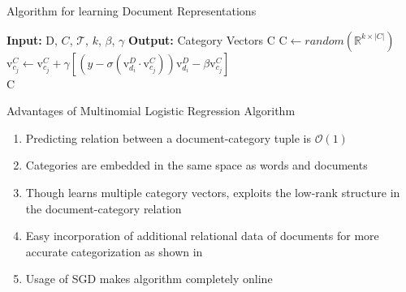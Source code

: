 \documentclass[10pt]{beamer}
\newcommand{\setC}{\ensuremath{C} }
\newcommand{\matD}{\ensuremath{\mathrm{D}} }
\newcommand{\matC}{\ensuremath{\mathrm{C}} }
\newcommand{\vecdi}[1]{\ensuremath{\mathrm{v}^{D}_{#1}}}
\newcommand{\vecci}[1]{\ensuremath{\mathrm{v}^{C}_{#1}}}
\newcommand{\traindata}{\ensuremath{\mathcal{T}}}
\begin{document}

\begin{frame}{Algorithm for learning Document Representations}
\begin{algorithm}[H]
\begin{algorithmic}[1]
 \State \textbf{Input: } $\matD$, $\setC$, $\traindata$, $k$, $\beta$, $\gamma$
 \State \textbf{Output: } Category Vectors $\matC$
 \State $\matC \gets random(\mathbb{R}^{k \times |\setC|})$
 \ForAll{$\{ d_{i}, c_{j}, y\} \in \traindata$}
  \State $\vecci{c_{j}} \gets \vecci{c_{j}} + \gamma \left[ ( y - \sigma(\vecdi{d_{i}}\cdot \vecci{c_{j}})) \vecdi{d_{i}} -\beta\vecci{c_{j}} \right]$
 \EndFor 
 \EndWhile
 \\
 \Return $\matC$
\end{algorithmic}
\caption{Learning Category Vector Representations}
\label{alg:cat_embeddings}
\end{algorithm}
\end{frame}


\begin{frame}{Advantages of Multinomial Logistic Regression Algorithm }

\begin{enumerate}
	\vfill\item<1-> Predicting relation between a document-category tuple is $\mathcal{O}(1)$
	\vfill\item<2-> Categories are embedded in the same space as words and documents
	\vfill\item<3-> Though learns multiple category vectors, exploits the low-rank structure in the document-category relation
	\vfill\item<4-> Easy incorporation of additional relational data of documents for more accurate categorization as shown in \citet{gupta2015collectively}
	\vfill\item<5-> Usage of SGD makes algorithm completely online
\end{enumerate}
\end{frame}

\end{document}
